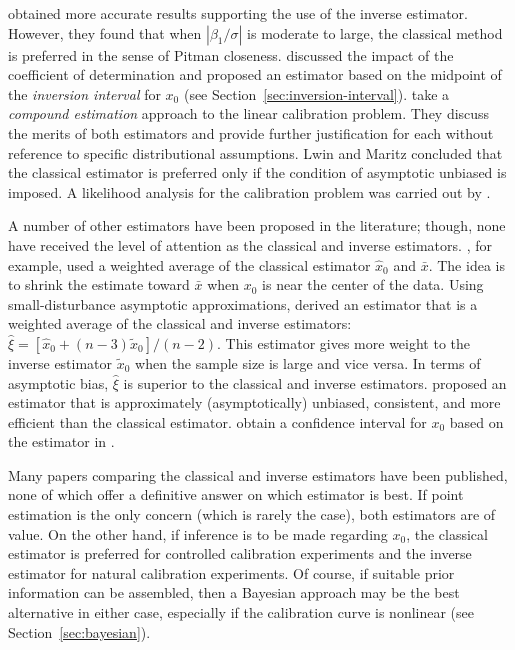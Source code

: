 \documentclass[cmfont,usenames,dvipsnames,leqno]{afit-etd}\usepackage[]{graphicx}\usepackage[]{color}
\newcommand{\wh}[1]{\ensuremath{\widehat{#1}}}
\newcommand{\wt}[1]{\ensuremath{\widetilde{#1}}}
\begin{document}
\citet{kannan_comparison_2007} obtained more accurate results supporting the use of the inverse estimator. However, they found that when $|\beta_1/\sigma|$ is moderate to large, the classical method is preferred in the sense of Pitman closeness. \citet{ali_calibration_2002} discussed the impact of the coefficient of determination and proposed an estimator based on the midpoint of the \textit{inversion interval} for $x_0$ (see Section~\ref{sec:inversion-interval}). \citet{lwin_analysis_1982} take a \textit{compound estimation} approach to the linear calibration problem. They discuss the merits of both estimators and provide further justification for each without reference to specific distributional assumptions. Lwin and Maritz concluded that the classical estimator is preferred only if the condition of asymptotic unbiased is imposed. A likelihood analysis for the calibration problem was carried out by \citet{minder_likelihood_1975}. 

A number of other estimators have been proposed in the literature; though, none have received the level of attention as the classical and inverse estimators. \citet{ali-alternative-1981}, for example, used a weighted average of the classical estimator $\wh{x}_0$ and $\bar{x}$. The idea is to shrink the estimate toward $\bar{x}$ when $x_0$ is near the center of the data. Using small-disturbance asymptotic approximations, \citet{srivastava-small-1989} derived an estimator that is a weighted average of the classical and inverse estimators: $\wh{\xi} = \left[\wh{x}_0 + (n-3)\wt{x}_0\right]/(n-2)$. This estimator gives more weight to the inverse estimator $\wt{x}_0$ when the sample size is large and vice versa. In terms of asymptotic bias, $\wh{\xi}$ is superior to the classical and inverse estimators. \citet{naszodi_elimination_1978} proposed an estimator that is approximately (asymptotically) unbiased, consistent, and more efficient than the classical estimator. \citet{dahiya-modified-1991} obtain a confidence interval for $x_0$ based on the estimator in \citet{naszodi_elimination_1978}. 

Many papers comparing the classical and inverse estimators have been published, none of which offer a definitive answer on which estimator is best. If point estimation is the only concern (which is rarely the case), both estimators are of value. On the other hand, if inference is to be made regarding $x_0$, the classical estimator is preferred for controlled calibration experiments and the inverse estimator for natural calibration experiments. Of course, if suitable prior information can be assembled, then a Bayesian approach may be the best alternative in either case, especially if the calibration curve is nonlinear (see Section~\ref{sec:bayesian}). 
\end{document}
